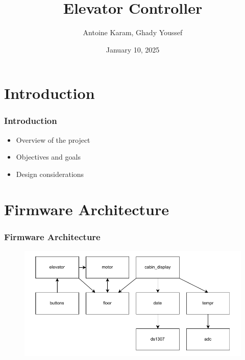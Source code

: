 \documentclass{beamer}
\title{Elevator Controller}
\author{Antoine Karam, Ghady Youssef}
\institute{Saint Joseph University of Beirut}
\date{January 10, 2025}
\begin{document}
\frame{\titlepage}

\section{Introduction}
\begin{frame}
    \frametitle{Introduction}
    \begin{itemize}
        \item Overview of the project
        \item Objectives and goals
        \item Design considerations
    \end{itemize}
\end{frame}

\section{Firmware Architecture}
\begin{frame}
    \frametitle{Firmware Architecture}
    \begin{figure}[h]
        \centering
        \includegraphics[width=\textwidth]{assets/block-diagram.pdf}
    \end{figure}
\end{frame}
\end{document}
